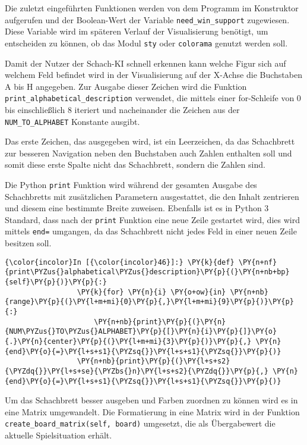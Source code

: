     Die zuletzt eingeführten Funktionen werden von dem Programm im
Konstruktor aufgerufen und der Boolean-Wert der Variable
\texttt{need\_win\_support} zugewiesen. Diese Variable wird im späteren
Verlauf der Visualisierung benötigt, um entscheiden zu können, ob das
Modul \texttt{sty} oder \texttt{colorama} genutzt werden soll.

    Damit der Nutzer der Schach-KI schnell erkennen kann welche Figur sich
auf welchem Feld befindet wird in der Visualisierung auf der X-Achse die
Buchstaben A bis H angegeben. Zur Ausgabe dieser Zeichen wird die
Funktion \texttt{print\_alphabetical\_description} verwendet, die
mittels einer for-Schleife von 0 bis einschließlich 8 iteriert und
nacheinander die Zeichen aus der \texttt{NUM\_TO\_ALPHABET} Konstante
ausgibt.

Das erste Zeichen, das ausgegeben wird, ist ein Leerzeichen, da das
Schachbrett zur besseren Navigation neben den Buchstaben auch Zahlen
enthalten soll und somit diese erste Spalte nicht das Schachbrett,
sondern die Zahlen sind.

Die Python \texttt{print} Funktion wird während der gesamten Ausgabe des
Schachbretts mit zusätzlichen Parametern ausgestattet, die den Inhalt
zentrieren und diesem eine bestimmte Breite zuweisen. Ebenfalls ist es
in Python 3 Standard, dass nach der \texttt{print} Funktion eine neue
Zeile gestartet wird, dies wird mittels
\texttt{end=\textquotesingle{}\textquotesingle{}} umgangen, da das
Schachbrett nicht jedes Feld in einer neuen Zeile besitzen soll.

    \begin{Verbatim}[commandchars=\\\{\}]
{\color{incolor}In [{\color{incolor}46}]:} \PY{k}{def} \PY{n+nf}{print\PYZus{}alphabetical\PYZus{}description}\PY{p}{(}\PY{n+nb+bp}{self}\PY{p}{)}\PY{p}{:}
                 \PY{k}{for} \PY{n}{i} \PY{o+ow}{in} \PY{n+nb}{range}\PY{p}{(}\PY{l+m+mi}{0}\PY{p}{,}\PY{l+m+mi}{9}\PY{p}{)}\PY{p}{:}
                     \PY{n+nb}{print}\PY{p}{(}\PY{n}{NUM\PYZus{}TO\PYZus{}ALPHABET}\PY{p}{[}\PY{n}{i}\PY{p}{]}\PY{o}{.}\PY{n}{center}\PY{p}{(}\PY{l+m+mi}{3}\PY{p}{)}\PY{p}{,} \PY{n}{end}\PY{o}{=}\PY{l+s+s1}{\PYZsq{}}\PY{l+s+s1}{\PYZsq{}}\PY{p}{)}
                 \PY{n+nb}{print}\PY{p}{(}\PY{l+s+s2}{\PYZdq{}}\PY{l+s+se}{\PYZbs{}n}\PY{l+s+s2}{\PYZdq{}}\PY{p}{,} \PY{n}{end}\PY{o}{=}\PY{l+s+s1}{\PYZsq{}}\PY{l+s+s1}{\PYZsq{}}\PY{p}{)}
\end{Verbatim}

    Um das Schachbrett besser ausgeben und Farben zuordnen zu können wird es
in eine Matrix umgewandelt. Die Formatierung in eine Matrix wird in der
Funktion \texttt{create\_board\_matrix(self,\ board)} umgesetzt, die als
Übergabewert die aktuelle Spielsituation erhält.

